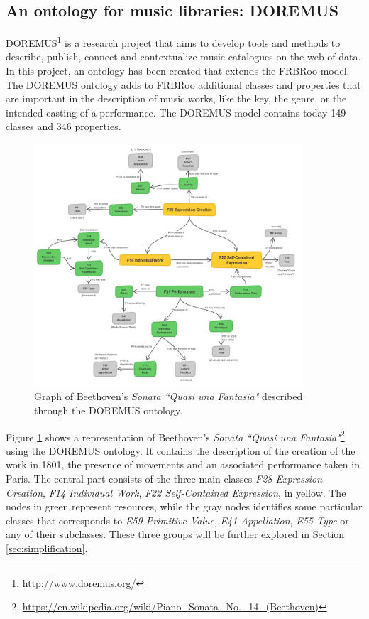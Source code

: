 \documentclass{llncs}
\begin{document}
\subsection{An ontology for music libraries: DOREMUS}
DOREMUS\footnote{\url{http://www.doremus.org/}} is a research project that aims to develop tools and methods to describe, publish, connect and contextualize music catalogues on the web of data. In this project, an ontology \cite{achichidoremus} has been created that extends the FRBRoo model. The DOREMUS ontology adds to FRBRoo additional classes and properties that are important in the description of music works, like the key, the genre, or the intended casting of a performance. The DOREMUS model contains today 149 classes and 346 properties.

\begin{figure}
\includegraphics[width=10cm]{img/Beethoven-Doremus.png}
\centering
\caption{Graph of Beethoven's \textit{Sonata ``Quasi una Fantasia"} described through the DOREMUS ontology.}
\label{fig:beet-doremus}
\end{figure}

Figure \ref{fig:beet-doremus} shows a representation of Beethoven's \textit{Sonata ``Quasi una Fantasia"}\footnote{\url{https://en.wikipedia.org/wiki/Piano_Sonata_No._14_(Beethoven)}} using the DOREMUS ontology. It contains the description of the creation of the work in 1801, the presence of movements and an associated performance taken in Paris. The central part consists of the three main classes \textit{F28 Expression Creation}, \textit{F14 Individual Work}, \textit{F22 Self-Contained Expression}, in yellow. The nodes in green represent resources, while the gray nodes identifies some particular classes that corresponds to \textit{E59 Primitive Value}, \textit{E41 Appellation}, \textit{E55 Type} or any of their subclasses. These three groups will be further explored in Section \ref{sec:simplification}.
\end{document}
